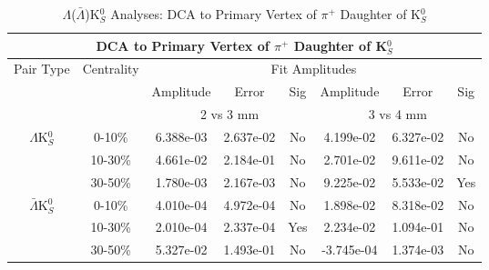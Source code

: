 \documentclass[../AnalysisNoteJBuxton.tex]{subfiles}
\begin{document}
\begin{table}
 \centering
 \begin{tabular}{|c|c|c|c|c||c|c|c|}
  \multicolumn{8}{c}{DCA to Primary Vertex of $\pi^{+}$ Daughter of K$^{0}_{S}$} \\
  \hline
  \multirow{3}{*}{Pair Type} & \multirow{3}{*}{Centrality} & \multicolumn{6}{c|}{Fit Amplitudes} \\
  \cline{3-8}
   & & Amplitude & Error & Sig & Amplitude & Error & Sig \\  
  \cline{3-8}
   & & \multicolumn{3}{c||}{2 vs 3 mm} & \multicolumn{3}{c|}{3 vs 4 mm} \\  
  \hline  
  \multirow{3}{*}{$\Lambda$K$^{0}_{S}$}  
   &  0-10\% & 6.388e-03 & 2.637e-02 & No & 4.199e-02 & 6.327e-02 & No \\
   & 10-30\% & 4.661e-02 & 2.184e-01 & No & 2.701e-02 & 9.611e-02 & No \\
   & 30-50\% & 1.780e-03 & 2.167e-03 & No & 9.225e-02 & 5.533e-02 & Yes \\
  \hline  
  \multirow{3}{*}{$\bar{\Lambda}$K$^{0}_{S}$}  
   &  0-10\% & 4.010e-04 & 4.972e-04 & No & 1.898e-02 & 8.318e-02 & No \\
   & 10-30\% & 2.010e-04 & 2.337e-04 & Yes & 2.234e-02 & 1.094e-01 & No \\
   & 30-50\% & 5.327e-02 & 1.493e-01 & No & -3.745e-04 & 1.374e-03 & No \\
  \hline
 \end{tabular}
 \caption{$\Lambda$($\bar{\Lambda}$)K$^{0}_{S}$ Analyses: DCA to Primary Vertex of $\pi^{+}$ Daughter of K$^{0}_{S}$}
 \label{tab:DcaToPrimVertexPosPionDaughtOfK0LamK0}
\end{table}
\end{document}
